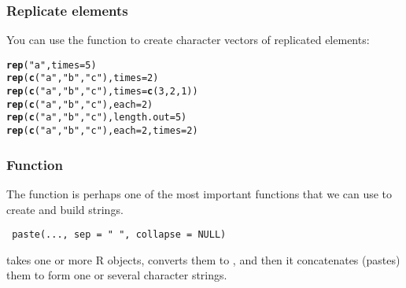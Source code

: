 \documentclass[12pt]{beamer}\usepackage[]{graphicx}\usepackage[]{color}
\makeatletter
\newcommand{\hlnum}[1]{\textcolor[rgb]{0.686,0.059,0.569}{#1}}%
\newcommand{\hlstr}[1]{\textcolor[rgb]{0.192,0.494,0.8}{#1}}%
\newcommand{\hlstd}[1]{\textcolor[rgb]{0.345,0.345,0.345}{#1}}%
\newcommand{\hlkwc}[1]{\textcolor[rgb]{0.333,0.667,0.333}{#1}}%
\newcommand{\hlkwd}[1]{\textcolor[rgb]{0.737,0.353,0.396}{\textbf{#1}}}%
\newenvironment{kframe}{%
 \def\at@end@of@kframe{}%
 \ifinner\ifhmode%
  \def\at@end@of@kframe{\end{minipage}}%
  \begin{minipage}{\columnwidth}%
 \fi\fi%
 \def\FrameCommand##1{\hskip\@totalleftmargin \hskip-\fboxsep
 \colorbox{shadecolor}{##1}\hskip-\fboxsep
     \hskip-\linewidth \hskip-\@totalleftmargin \hskip\columnwidth}%
 \MakeFramed {\advance\hsize-\width
   \@totalleftmargin\z@ \linewidth\hsize
   \@setminipage}}%
 {\par\unskip\endMakeFramed%
 \at@end@of@kframe}
\newenvironment{knitrout}{}{} %
\makeatother
\begin{document}

\begin{frame}[fragile]
\frametitle{Replicate elements}

You can use the function {\hilit {}} to create character vectors of replicated elements:
\begin{knitrout}\footnotesize
{}\color{fgcolor}\begin{kframe}
\begin{alltt}
\hlkwd{rep}\hlstd{(}\hlstr{"a"}\hlstd{,} \hlkwc{times} \hlstd{=} \hlnum{5}\hlstd{)}
\hlkwd{rep}\hlstd{(}\hlkwd{c}\hlstd{(}\hlstr{"a"}\hlstd{,} \hlstr{"b"}\hlstd{,} \hlstr{"c"}\hlstd{),} \hlkwc{times} \hlstd{=} \hlnum{2}\hlstd{)}
\hlkwd{rep}\hlstd{(}\hlkwd{c}\hlstd{(}\hlstr{"a"}\hlstd{,} \hlstr{"b"}\hlstd{,} \hlstr{"c"}\hlstd{),} \hlkwc{times} \hlstd{=} \hlkwd{c}\hlstd{(}\hlnum{3}\hlstd{,} \hlnum{2}\hlstd{,} \hlnum{1}\hlstd{))}
\hlkwd{rep}\hlstd{(}\hlkwd{c}\hlstd{(}\hlstr{"a"}\hlstd{,} \hlstr{"b"}\hlstd{,} \hlstr{"c"}\hlstd{),} \hlkwc{each} \hlstd{=} \hlnum{2}\hlstd{)}
\hlkwd{rep}\hlstd{(}\hlkwd{c}\hlstd{(}\hlstr{"a"}\hlstd{,} \hlstr{"b"}\hlstd{,} \hlstr{"c"}\hlstd{),} \hlkwc{length.out} \hlstd{=} \hlnum{5}\hlstd{)}
\hlkwd{rep}\hlstd{(}\hlkwd{c}\hlstd{(}\hlstr{"a"}\hlstd{,} \hlstr{"b"}\hlstd{,} \hlstr{"c"}\hlstd{),} \hlkwc{each} \hlstd{=} \hlnum{2}\hlstd{,} \hlkwc{times} \hlstd{=} \hlnum{2}\hlstd{)}
\end{alltt}
\end{kframe}
\end{knitrout}

\end{frame}


\begin{frame}
\begin{center}
\Huge{}
\end{center}
\end{frame}


\begin{frame}[fragile]
\frametitle{Function }

The function  is perhaps one of the most important functions that we can use to create and build strings. 

\begin{verbatim}
 paste(..., sep = " ", collapse = NULL)
\end{verbatim}

 takes one or more R objects, converts them to , and then it concatenates (pastes) them to form one or several character strings.

\end{frame}
\end{document}
